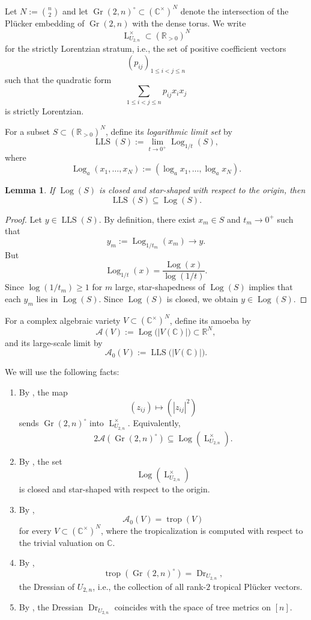 \documentclass[12pt]{amsart}
\newtheorem{lemma}[theorem]{Lemma}
\theoremstyle{definition}
\newcommand{\1}{\mathbf{1}}
\DeclareMathOperator{\upL}{L}   %
\DeclareMathOperator{\Gr}{Gr}
\newcommand\C{{\mathbb C}}
\newcommand\R{{\mathbb R}}
\begin{document}
Let $N:=\binom n2$ and let $\Gr(2,n)^\circ\subset (\C^\times)^N$
denote the intersection of the Pl\"ucker embedding of $\Gr(2,n)$ with the dense torus.
We write
\[
\upL_{U_{2,n}}^\times\subset (\R_{>0})^N
\]
for the strictly Lorentzian stratum, i.e., the set of positive coefficient vectors
\[
(p_{ij})_{1\le i<j\le n}
\]
such that the quadratic form
\[
\sum_{1\le i<j\le n} p_{ij}x_i x_j
\]
is strictly Lorentzian.

For a subset $S\subset (\R_{>0})^N$, define its \emph{logarithmic limit set} by
\[
\operatorname{LLS}(S)
:=
\lim_{t\to 0^+}\operatorname{Log}_{1/t}(S),
\]
where
\[
\operatorname{Log}_a(x_1,\dots,x_N)
:=
(\log_a x_1,\dots,
\log_a x_N).
\]

\begin{lemma}
\label{lem:LLS-star-shaped}
If $\operatorname{Log}(S)$ is closed and star-shaped with respect to the origin, then
\[
\operatorname{LLS}(S)\subseteq \operatorname{Log}(S).
\]
\end{lemma}

\begin{proof}
Let $y\in\operatorname{LLS}(S)$.  By definition, there exist $x_m\in S$ and
$t_m\to 0^+$ such that
\[
y_m:=\operatorname{Log}_{1/t_m}(x_m)\to y.
\]
But
\[
\operatorname{Log}_{1/t}(x)=\frac{\operatorname{Log}(x)}{\log(1/t)}.
\]
Since $\log(1/t_m)\ge 1$ for $m$ large, star-shapedness of $\operatorname{Log}(S)$
implies that each $y_m$ lies in $\operatorname{Log}(S)$.  Since
$\operatorname{Log}(S)$ is closed, we obtain $y\in\operatorname{Log}(S)$.
\end{proof}

For a complex algebraic variety $V\subset (\C^\times)^N$, define its amoeba by
\[
\mathcal A(V):=\operatorname{Log}\bigl(|V(\C)|\bigr)\subset \R^N,
\]
and its large-scale limit by
\[
\mathcal A_0(V):=\operatorname{LLS}\bigl(|V(\C)|\bigr).
\]

We will use the following facts:
\begin{enumerate}
\item By \cite[Theorem 5.1]{BHKL1}, the map
\[
(z_{ij})\longmapsto (|z_{ij}|^2)
\]
sends $\Gr(2,n)^\circ$ into $\upL_{U_{2,n}}^\times$.  Equivalently,
\[
2\mathcal A(\Gr(2,n)^\circ)
\subseteq
\operatorname{Log}(\upL_{U_{2,n}}^\times).
\]
\item By \cite[Theorem 4.4]{BHKL1}, the set
\[
\operatorname{Log}(\upL_{U_{2,n}}^\times)
\]
is closed and star-shaped with respect to the origin.
\item By \cite[Theorem A]{Jonsson16},
\[
\mathcal A_0(V)=\operatorname{trop}(V)
\]
for every $V\subset (\C^\times)^N$, where the tropicalization is computed with respect to the trivial valuation on $\C$.
\item By \cite[Theorem 3.4]{Speyer-Sturmfels04},
\[
\operatorname{trop}(\Gr(2,n)^\circ)=\operatorname{Dr}_{U_{2,n}},
\]
the Dressian of $U_{2,n}$, i.e., the collection of all rank-$2$ tropical Pl\"ucker vectors.
\item By \cite[Theorem 4.3.5]{Maclagan-Sturmfels15}, the Dressian $\operatorname{Dr}_{U_{2,n}}$ coincides with the space of tree metrics on $[n]$.
\end{enumerate}
\end{document}
